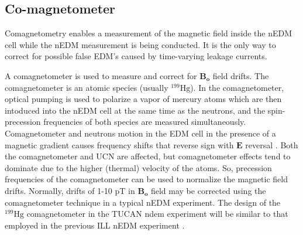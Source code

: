 




\subsection{Co-magnetometer}
Comagnetometry enables a measurement of the magnetic field inside the nEDM cell while the nEDM measurement is being conducted. It is the only way to correct for possible false EDM's caused by time-varying leakage currents. 

A comagnetometer is used to measure and correct for  $\bm{B_o}$ field drifts. The comagnetometer is an atomic species (usually $^{199}\text{Hg}$). In the comagnetometer, optical pumping is used to polarize a vapor of mercury atoms  which are then intoduced into the
nEDM cell at the same time as the neutrons, and the spin-precession frequencies of both species are measured simultaneously. Comagnetometer and neutrons motion in the EDM cell in the presence of a magnetic gradient causes frequency shifts that reverse sign with $\bm{E}$ reversal \cite{comag_1,comag_2,comag_3}. Both the comagnetometer and UCN are affected, but comagnetometer effects tend to dominate due to the higher (thermal) velocity of the atoms. So, precession frequencies of the comagnetometer can be used to normalize the magnetic field drifts. Normally, drifts of 1-10 pT in $\bm{B_o}$ field may be corrected using the comagnetometer technique in a typical nEDM experiment. The design of the $^{199}\mathrm{Hg}$ comagnetometer in the TUCAN ndem experiment will be similar to that employed in the previous ILL nEDM experiment \cite{bestLim_1,comag_4}.


